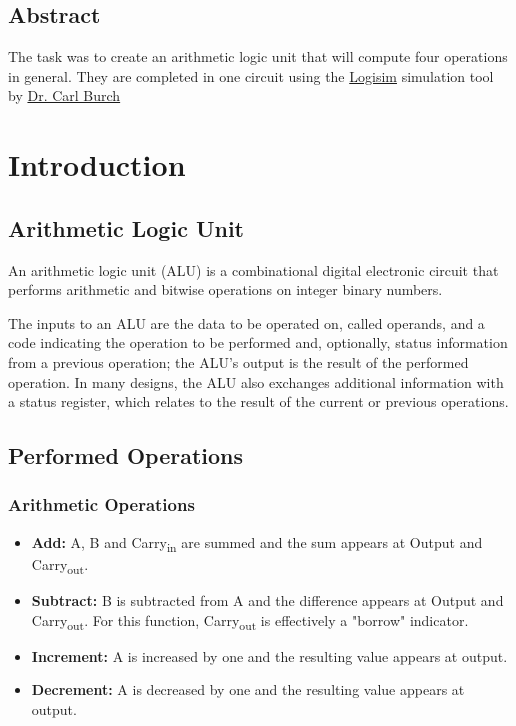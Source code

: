 \documentclass[a4paper, 12pt, twoside]{scrreprt}
\begin{document}
\setcounter{page}{1}
\section*{\huge Abstract}
The task was to create an arithmetic logic unit that will compute four operations in general. They are completed in one circuit using the \href{http://www.cburch.com/logisim/}{Logisim} simulation  tool by \href{http://www.cburch.com/}{Dr. Carl Burch}
\vfill
\newpage

\tableofcontents
\listoffigures
\listoftables

\chapter{Introduction}
\setcounter{page}{1}
\section{Arithmetic Logic Unit}
An arithmetic logic unit (ALU) is a combinational digital electronic circuit that performs arithmetic and bitwise operations on integer binary numbers.

The inputs to an ALU are the data to be operated on, called operands, and a code indicating the operation to be performed and, optionally, status information from a previous operation; the ALU's output is the result of the performed operation. In many designs, the ALU also exchanges additional information with a status register, which relates to the result of the current or previous operations.

\section{Performed Operations}
\subsection{Arithmetic Operations}
\begin{itemize}
\item \textbf{Add:} A, B and Carry\textsubscript{in} are summed and the sum appears at Output and Carry\textsubscript{out}.
\item \textbf{Subtract:} B is subtracted from A and the difference appears at Output and Carry\textsubscript{out}. For this function, Carry\textsubscript{out} is effectively a "borrow" indicator. 
\item \textbf{Increment:} A is increased by one and the resulting value appears at output.
\item \textbf{Decrement:} A is decreased by one and the resulting value appears at output.
\end{itemize}
\end{document}
